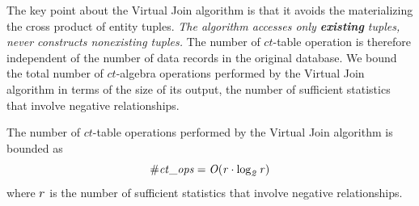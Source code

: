 \documentclass{acm_proc_article-sp}
\newcommand{\ct}{\mathit{ct}}
\begin{document}
The key point about the Virtual Join algorithm %
is that it avoids the materializing the cross product of entity tuples. {\em The algorithm accesses  only \textbf{existing} tuples, never constructs nonexisting tuples.} The number of $\ct$-table operation is therefore independent of the number of data records in the original database. We bound the total number of $\ct$-algebra operations performed by the Virtual Join algorithm in terms of the size of its output, the number of sufficient statistics that involve negative relationships. 
%
\begin{proposition}
The number of $\ct$-table operations performed by the Virtual Join algorithm is bounded as $$\it{\# \ct\_\it{ops}} = O(r \cdot \log_{2} r)$$ where $r$ is the number of sufficient statistics that involve negative relationships.
\end{proposition}
%
\end{document}
